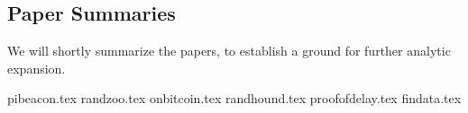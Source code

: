 \subsection{Paper Summaries}\label{sec:papersummaries}
We will shortly summarize the papers, to establish a ground for further analytic expansion.

\begin{description}
    {pibeacon.tex}
    {randzoo.tex}
    {onbitcoin.tex}
    {randhound.tex}
    {proofofdelay.tex}
    {findata.tex}
\end{description}

